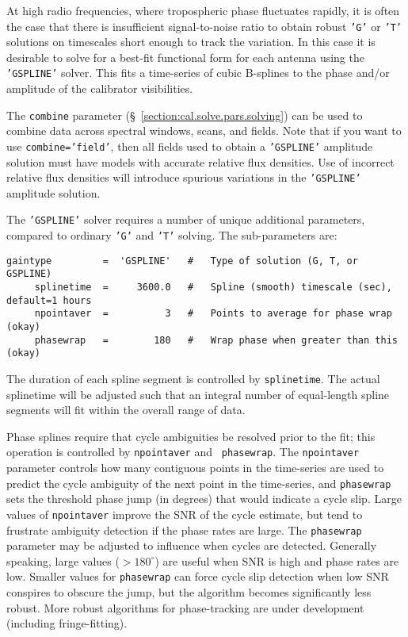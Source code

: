 At high radio frequencies, where tropospheric phase fluctuates
rapidly, it is often the case that there is insufficient
signal-to-noise ratio to obtain robust {\tt 'G'} or {\tt 'T'}
solutions on timescales short enough to track the 
variation.  In this case it is desirable to solve for a best-fit
functional form for each antenna using the {\tt 'GSPLINE'} solver.  
This fits a time-series of cubic B-splines to the phase and/or
amplitude of the calibrator visibilities.  

The {\tt combine} parameter (\S~\ref{section:cal.solve.pars.solving}) 
can be used to combine data across spectral windows, scans, and
fields.  Note that if you want to use {\tt combine='field'},
then all fields used to obtain a {\tt 'GSPLINE'} amplitude solution must have
models with accurate relative flux densities.  Use of incorrect
relative flux densities will introduce spurious variations in the
{\tt 'GSPLINE'} amplitude solution.

The {\tt 'GSPLINE'} solver requires a number of unique additional parameters,
compared to ordinary {\tt 'G'} and {\tt 'T'} solving.  The sub-parameters are:
\small
\begin{verbatim}
gaintype         =  'GSPLINE'   #   Type of solution (G, T, or GSPLINE)
     splinetime  =     3600.0   #   Spline (smooth) timescale (sec), default=1 hours
     npointaver  =          3   #   Points to average for phase wrap (okay)
     phasewrap   =        180   #   Wrap phase when greater than this (okay)
\end{verbatim}
\normalsize

The duration of each spline segment is controlled by {\tt splinetime}.
The actual splinetime will be adjusted such that an integral number of
equal-length spline segments will fit within the overall range of
data.

Phase splines require that cycle ambiguities be resolved prior to the
fit; this operation is controlled by {\tt npointaver} and {\tt
phasewrap}.  The {\tt npointaver} parameter controls how many
contiguous points in the time-series are used to predict the cycle
ambiguity of the next point in the time-series, and {\tt phasewrap} sets
the threshold phase jump (in degrees) that would indicate a cycle
slip.  Large values of {\tt npointaver} improve the SNR of the cycle
estimate, but tend to frustrate ambiguity detection if the phase rates
are large.  The {\tt phasewrap} parameter may be adjusted to influence
when cycles are detected.  Generally speaking, large values
($>180^\circ$) are useful when SNR is high and phase rates are
low. Smaller values for {\tt phasewrap} can force cycle slip detection
when low SNR conspires to obscure the jump, but the algorithm becomes
significantly less robust.  More robust algorithms for phase-tracking
are under development (including fringe-fitting).

